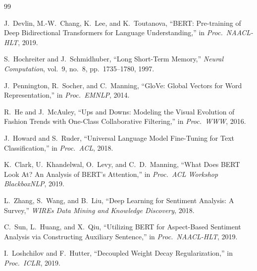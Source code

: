\documentclass[11pt, a4paper]{article}
\begin{document}
\begin{thebibliography}{99}

J.\ Devlin, M.-W.\ Chang, K.\ Lee, and K.\ Toutanova,
``BERT: Pre-training of Deep Bidirectional Transformers for Language Understanding,''
in \textit{Proc.\ NAACL-HLT}, 2019.

S.\ Hochreiter and J.\ Schmidhuber,
``Long Short-Term Memory,''
\textit{Neural Computation}, vol.\ 9, no.\ 8, pp.\ 1735--1780, 1997.

J.\ Pennington, R.\ Socher, and C.\ Manning,
``GloVe: Global Vectors for Word Representation,''
in \textit{Proc.\ EMNLP}, 2014.

R.\ He and J.\ McAuley,
``Ups and Downs: Modeling the Visual Evolution of Fashion Trends with One-Class Collaborative Filtering,''
in \textit{Proc.\ WWW}, 2016.

J.\ Howard and S.\ Ruder,
``Universal Language Model Fine-Tuning for Text Classification,''
in \textit{Proc.\ ACL}, 2018.

K.\ Clark, U.\ Khandelwal, O.\ Levy, and C.\ D.\ Manning,
``What Does BERT Look At? An Analysis of BERT's Attention,''
in \textit{Proc.\ ACL Workshop BlackboxNLP}, 2019.

L.\ Zhang, S.\ Wang, and B.\ Liu,
``Deep Learning for Sentiment Analysis: A Survey,''
\textit{WIREs Data Mining and Knowledge Discovery}, 2018.

C.\ Sun, L.\ Huang, and X.\ Qiu,
``Utilizing BERT for Aspect-Based Sentiment Analysis via Constructing Auxiliary Sentence,''
in \textit{Proc.\ NAACL-HLT}, 2019.

I.\ Loshchilov and F.\ Hutter,
``Decoupled Weight Decay Regularization,''
in \textit{Proc.\ ICLR}, 2019.

\end{thebibliography}
\end{document}
